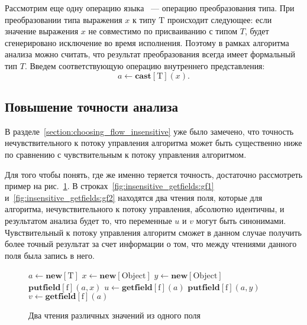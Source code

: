 \documentclass[14pt,titlepage,draft]{extarticle}
\newcommand{\java}{\eng{Java}\xspace}
\newcommand{\type}[1]{\mathrm{#1}}
\newcommand{\field}[1]{\mathrm{#1}}
\newcommand{\op}[1]{\mathbf{#1}}
\begin{document}
    Рассмотрим еще одну операцию языка \java~--- операцию преобразования типа. При
    преобразовании типа выражения $x$ к типу $\type{T}$ происходит следующее:
    если значение выражения $x$ не совместимо по присваиванию с типом $T$,
    будет сгенерировано исключение во время исполнения.
    Поэтому в рамках алгоритма анализа можно считать, что результат
    преобразования всегда имеет формальный тип $T$.
    Введем соответствующую операцию внутреннего представления:
    \[ a \gets \op{cast}[\type{T}](x). \]

  \subsection{Повышение точности анализа}
    \label{section:increase_accuracy}

    В разделе~\ref{section:choosing_flow_insensitive} уже было замечено, что
    точность нечувствительного к потоку управления алгоритма может быть
    существенно ниже по сравнению с чувствительным к потоку управления
    алгоритмом.

    Для того чтобы понять, где же именно теряется точность, достаточно
    рассмотреть пример на рис.~\ref{fig:insensitive_getfields}. В
    строках~\ref{fig:insensitive_getfields:gf1}
    и~\ref{fig:insensitive_getfields:gf2} находятся два чтения поля, которые
    для алгоритма, нечувствительного к потоку управления, абсолютно идентичны,
    и результатом анализа будет то, что переменные $u$ и $v$ могут быть
    синонимами. Чувствительный к потоку управления алгоритм сможет в данном
    случае получить более точный результат за счет информации о том, что между
    чтениями данного поля была запись в него.

    \begin{figure}[htbp]
      \begin{algorithmic}[1]
        \State $a \gets \op{new}[\type{T}]$
        \State $x \gets \op{new}[\type{Object}]$
        \State $y \gets \op{new}[\type{Object}]$
        \State $\op{putfield}[\field{f}](a, x)$
        \State $u \gets \op{getfield}[\field{f}](a)$
          \label{fig:insensitive_getfields:gf1}
        \State $\op{putfield}[\field{f}](a, y)$
        \State $v \gets \op{getfield}[\field{f}](a)$
          \label{fig:insensitive_getfields:gf2}
      \end{algorithmic}
      \caption{Два чтения различных значений из одного поля}
      \label{fig:insensitive_getfields}
    \end{figure}
\end{document}
